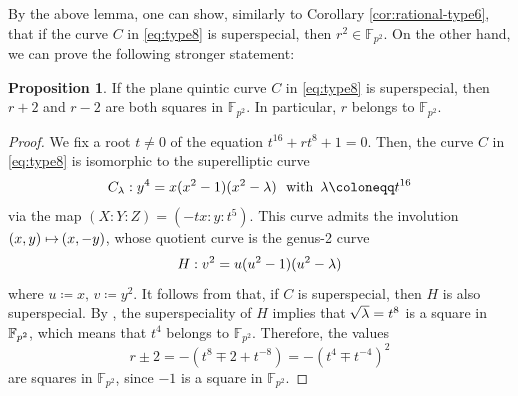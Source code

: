 \documentclass{article}
\theoremstyle{definition}
\newtheorem{Prop}[Def]{Proposition}
\begin{document}
By the above lemma, one can show, similarly to Corollary \ref{cor:rational-type6}, that if the curve $C$ in \eqref{eq:type8} is superspecial, then $r^2 \in \mathbb{F}_{p^2}$.
On the other hand, we can prove the following stronger statement:\vspace{-1.4mm}
\begin{Prop}\label{prop:rational_for_type8}
If the plane quintic curve $C$ in \eqref{eq:type8} is superspecial, then $r+2$ and $r-2$ are both squares in $\mathbb{F}_{p^2}$\hspace{-0.2mm}. In particular, $r$ belongs to $\mathbb{F}_{p^2}$.\vspace{-1mm}
\end{Prop}
\begin{proof}
We fix a root $t \neq 0$ of the equation $t^{16}+rt^8+1 = 0$.
Then, the curve $C$ in \eqref{eq:type8} is isomorphic to the superelliptic curve\vspace{-1.1mm}
\begin{equation}\label{eq:Clambda_for_type8}
    C_\lambda: y^4 = x(x^2-1)(x^2-\lambda) \ \text{ with }\, \lambda \coloneqq t^{16}\vspace{1.2mm}
\end{equation}
via the map $(X:Y:Z) = (-tx:y:t^5)$.
This curve admits the involution $(x,y) \mapsto\hspace{-0.3mm} (x,-y)$, whose quotient curve is the genus-2 curve\vspace{-1mm}
\begin{equation}\label{eq:H}
    H: v^2 = u(u^2-1)(u^2-\lambda)\vspace{1mm}
\end{equation}
where $u \coloneqq x,\,v \coloneqq y^2$.
It follows from \cite[Corollary 2.8]{KNT} that, if $C$ is superspecial, then $H$ is also superspecial.
By \cite[Main \hspace{-0.1mm}Theorem \hspace{-0.2mm}A(1)]{Ohashi}, the superspeciality of $H$ implies that $\hspace{-0.2mm}\sqrt{\lambda} = t^8$ is a square in $\mathbb{F}_{p^2}\hspace{-0.2mm}$, which means that $t^4$ belongs to $\mathbb{F}_{p^2}$.
Therefore, the values\vspace{-1.3mm}
\[
    r \pm 2 = -(t^8 \mp 2 + t^{-8}) = -(t^4 \mp t^{-4})^2
\]
are squares in $\mathbb{F}_{p^2}$, since $-1$ is a square in $\mathbb{F}_{p^2}$.
\end{proof}
\end{document}
